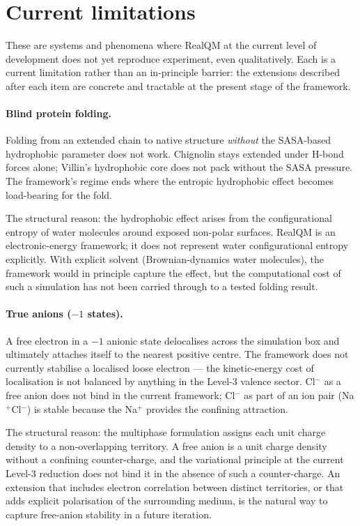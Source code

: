 \section{Current limitations}\label{sec:current-limitations}

These are systems and phenomena where RealQM at the current level of development does not yet reproduce experiment, even qualitatively. Each is a current limitation rather than an in-principle barrier: the extensions described after each item are concrete and tractable at the present stage of the framework.

\paragraph{Blind protein folding.}
Folding from an extended chain to native structure \emph{without} the SASA-based hydrophobic parameter does not work. Chignolin stays extended under H-bond forces alone; Villin's hydrophobic core does not pack without the SASA pressure. The framework's regime ends where the entropic hydrophobic effect becomes load-bearing for the fold.

The structural reason: the hydrophobic effect arises from the configurational entropy of water molecules around exposed non-polar surfaces. RealQM is an electronic-energy framework; it does not represent water configurational entropy explicitly. With explicit solvent (Brownian-dynamics water molecules), the framework would in principle capture the effect, but the computational cost of such a simulation has not been carried through to a tested folding result.

\paragraph{True anions ($-1$ states).}
A free electron in a $-1$ anionic state delocalises across the simulation box and ultimately attaches itself to the nearest positive centre. The framework does not currently stabilise a localised loose electron --- the kinetic-energy cost of localisation is not balanced by anything in the Level-3 valence sector. Cl$^-$ as a free anion does not bind in the current framework; Cl$^-$ as part of an ion pair (Na$^+$Cl$^-$) is stable because the Na$^+$ provides the confining attraction.

The structural reason: the multiphase formulation assigns each unit charge density to a non-overlapping territory. A free anion is a unit charge density without a confining counter-charge, and the variational principle at the current Level-3 reduction does not bind it in the absence of such a counter-charge. An extension that includes electron correlation between distinct territories, or that adds explicit polarisation of the surrounding medium, is the natural way to capture free-anion stability in a future iteration.


